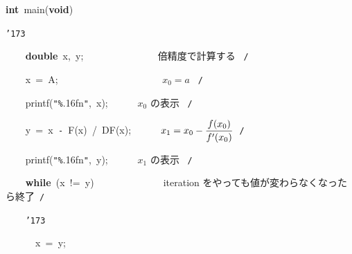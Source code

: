 \documentclass[a4paper,10pt]{article}
\def\mc{\relax}
\begin{document}
\noindent
\mbox{}\hfill

\noindent
\mbox{}\textbf{int}{\tt\mc \ }main(\textbf{void})

\noindent
\mbox{}{\tt\char'173}

\noindent
\mbox{}{\tt\mc \ }{\tt\mc \ }{\tt\mc \ }{\tt\mc \ }\textbf{double}{\tt\mc \ }x,{\tt\mc \ }y;{\tt\mc \ }{\tt\mc \ }{\tt\mc \ }{\tt\mc \ }{\tt\mc \ }{\tt\mc \ }{\tt\mc \ }{\tt\mc \ }{\tt\mc \ }{\tt\mc \ }{\tt\mc \ }{\tt\mc \ }{\tt\mc \ }{\tt\mc \ }\rm\mc {\tt /}{\tt *}\  倍精度で計算する \hfill \rm\mc \ {\tt *}{\tt /}
\tt\mc 

\noindent
\mbox{}\hfill

\noindent
\mbox{}{\tt\mc \ }{\tt\mc \ }{\tt\mc \ }{\tt\mc \ }x{\tt\mc \ }={\tt\mc \ }A;{\tt\mc \ }{\tt\mc \ }{\tt\mc \ }{\tt\mc \ }{\tt\mc \ }{\tt\mc \ }{\tt\mc \ }{\tt\mc \ }{\tt\mc \ }{\tt\mc \ }{\tt\mc \ }{\tt\mc \ }{\tt\mc \ }{\tt\mc \ }{\tt\mc \ }{\tt\mc \ }{\tt\mc \ }{\tt\mc \ }{\tt\mc \ }{\tt\mc \ }\rm\mc {\tt /}{\tt *}\  $\displaystyle x_0=a$ \hfill \rm\mc \ {\tt *}{\tt /}
\tt\mc 

\noindent
\mbox{}{\tt\mc \ }{\tt\mc \ }{\tt\mc \ }{\tt\mc \ }printf({\tt "}{\tt\%}.16f{\tt{}}n{\tt "},{\tt\mc \ }x);{\tt\mc \ }{\tt\mc \ }{\tt\mc \ }{\tt\mc \ }{\tt\mc \ }\rm\mc {\tt /}{\tt *}\  $x_0$ の表示 \hfill \rm\mc \ {\tt *}{\tt /}
\tt\mc 

\noindent
\mbox{}{\tt\mc \ }{\tt\mc \ }{\tt\mc \ }{\tt\mc \ }y{\tt\mc \ }={\tt\mc \ }x{\tt\mc \ }{\tt -}{\tt\mc \ }F(x){\tt\mc \ }/{\tt\mc \ }DF(x);{\tt\mc \ }{\tt\mc \ }{\tt\mc \ }{\tt\mc \ }{\tt\mc \ }\rm\mc {\tt /}{\tt *}\  $\displaystyle x_1=x_0 - {f(x_0)\over f'(x_0)}$\hfill \rm\mc \ {\tt *}{\tt /}
\tt\mc 

\noindent
\mbox{}{\tt\mc \ }{\tt\mc \ }{\tt\mc \ }{\tt\mc \ }printf({\tt "}{\tt\%}.16f{\tt{}}n{\tt "},{\tt\mc \ }y);{\tt\mc \ }{\tt\mc \ }{\tt\mc \ }{\tt\mc \ }{\tt\mc \ }\rm\mc {\tt /}{\tt *}\  $x_1$ の表示 \hfill \rm\mc \ {\tt *}{\tt /}
\tt\mc 

\noindent
\mbox{}{\tt\mc \ }{\tt\mc \ }{\tt\mc \ }{\tt\mc \ }\textbf{while}{\tt\mc \ }(x{\tt\mc \ }!={\tt\mc \ }y){\tt\mc \ }{\tt\mc \ }{\tt\mc \ }{\tt\mc \ }{\tt\mc \ }{\tt\mc \ }{\tt\mc \ }{\tt\mc \ }{\tt\mc \ }{\tt\mc \ }{\tt\mc \ }{\tt\mc \ }\rm\mc {\tt /}{\tt *}\  \ iteration をやっても値が変わらなくなったら終了\hfill \rm\mc \ {\tt *}{\tt /}
\tt\mc 

\noindent
\mbox{}{\tt\mc \ }{\tt\mc \ }{\tt\mc \ }{\tt\mc \ }{\tt\char'173}

\noindent
\mbox{}{\tt\mc \ }{\tt\mc \ }{\tt\mc \ }{\tt\mc \ }{\tt\mc \ }{\tt\mc \ }x{\tt\mc \ }={\tt\mc \ }y;
\end{document}
